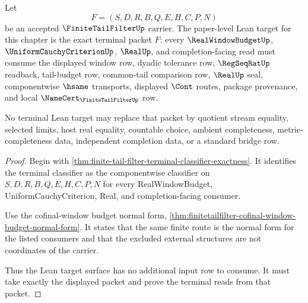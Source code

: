 \begin{theorem}
\label{thm:finite-tail-filter-terminal-lean-target-surface}
Let
$$
F=(S,D,R,B,Q,E,H,C,P,N)
$$
be an accepted $\FiniteTailFilterUp$ carrier. The paper-level Lean target for this chapter is the exact terminal packet $F$: every $\RealWindowBudgetUp$, $\UniformCauchyCriterionUp$, $\RealUp$, and completion-facing read must consume the displayed window row, dyadic tolerance row, $\RegSeqRatUp$ readback, tail-budget row, common-tail comparison row, $\RealUp$ seal, componentwise $\hsame$ transports, displayed $\Cont$ routes, package provenance, and local $\NameCert_{\FiniteTailFilterUp}$ row.

No terminal Lean target may replace that packet by quotient stream equality, selected limits, host real equality, countable choice, ambient completeness, metric-completeness data, independent completion data, or a standard bridge row.
\end{theorem}
\begin{proof}
Begin with \autoref{thm:finite-tail-filter-terminal-classifier-exactness}. It identifies the terminal classifier as the componentwise classifier on $S,D,R,B,Q,E,H,C,P,N$ for every RealWindowBudget, UniformCauchyCriterion, Real, and completion-facing consumer.

Use the cofinal-window budget normal form, \autoref{thm:finitetailfilter-cofinal-window-budget-normal-form}. It states that the same finite route is the normal form for the listed consumers and that the excluded external structures are not coordinates of the carrier.

Thus the Lean target surface has no additional input row to consume. It must take exactly the displayed packet and prove the terminal reads from that packet.
\end{proof}

